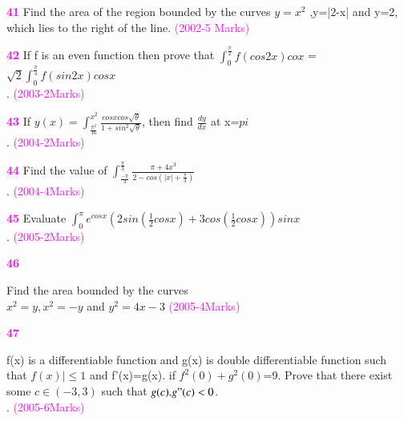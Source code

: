 \documentclass[journal,12pt,twocolumn]{IEEEtran}
\theoremstyle{remark}
\begin{document}
																  \textbf{\textcolor{magenta}{41}}
																    Find the area of the region bounded by the curves $y=x^2$ ,y=|2-x| and y=2, which lies to the right of the line.
																      \hfill{\textcolor{magenta}{(2002-5 Marks) }}

																        \textbf{\textcolor{magenta}{42}}
																	  If f is an even function then prove that 
																	    $\int_{0}^{\frac{\pi}{2}}f(cos2x)cox $ =$\sqrt{2}\int_{0}^{\frac{\pi}{4}}f(sin2x)cosx$\\.
																	      \hfill{\textcolor{magenta}{(2003-2Marks)}}
																	        
																		   \textbf{\textcolor{magenta}{43}}
																		      If $y(x)=\int_{\frac{\pi^2}{16}}^{x^2}\frac{cosxcos\sqrt{\theta}}{1+sin^2\sqrt{\theta}}$, then find $\frac{dy}{dx}$ at x=$pi$\\.
																		         \hfill{\textcolor{magenta}{(2004-2Marks)}}

																			    \textbf{\textcolor{magenta}{44}}
																			       Find the value of $\int_{\frac{-\pi}{3}}^{\frac{\pi}{3}}\frac{\pi+4x^3}{2-cos(|x|+\frac{\pi}{3})}$\\.
																			          \hfill{\textcolor{magenta}{(2004-4Marks)}}

																				     \textbf{\textcolor{magenta}{45}}
																				        Evaluate $\int_{0}^{\pi}e^{cosx}(2sin(\frac{1}{2}cosx)+3cos(\frac{1}{2}cosx))sinx$\\.
																					   \hfill{\textcolor{magenta}{(2005-2Marks)}}

																					      \textbf{\textcolor{magenta}{46}}
																					         
																						    Find the area bounded by the curves \\  
																						       $x^2=y,x^2=-y$ and $y^2=4x-3$
																						          \hfill{\textcolor{magenta}{(2005-4Marks)}}
																							     
																							        \textbf{\textcolor{magenta}{47}}
																								   
																								      f(x) is a differentiable function and g(x) is  double differentiable function such that $f(x)|\le1$ and f'(x)=g(x). if $f^2(0)+g^2(0)$=9. Prove that there exist some $c\in(-3,3)$ such that $g(c).g"(c)<0$.\\.
																								         \hfill{\textcolor{magenta}{(2005-6Marks)}}
\end{document}

